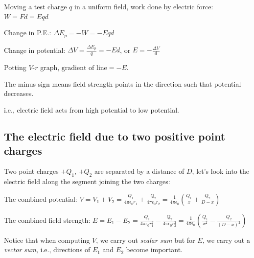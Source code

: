 \documentclass[a4paper,12pt]{book}
\begin{document}
Moving a test charge $q$ in a uniform field, work done by electric force: $W=Fd = Eqd$
		
Change in P.E.: $\Delta E_p = -W = -Eqd$

Change in potential: $\Delta V = \frac{\Delta E_p}{q} = - Ed$, or $E=-\frac{\Delta V}{d}$

Potting $V$-$r$ graph, $\text{gradient of line}=-E$.

The minus sign means field strength points in the direction such that potential decreases.

i.e., electric field acts from high potential to low potential.

\subsection*{The electric field due to two positive point charges}

Two point charges $+Q_1$, $+Q_2$ are separated by a distance of $D$, let's look into the electric field along the segment joining the two charges:

\begin{center}
\end{center}

The combined potential: $V = V_1 + V_2 = \frac{Q_1}{4\pi\epsilon_0r_1} + \frac{Q_2}{4\pi\epsilon_0r_2} = \frac{1}{4\pi\epsilon_0}\left(\frac{Q_1}{x} + \frac{Q_2}{D-x}\right)$

The combined field strength: $E = E_1 - E_2 = \frac{Q_1}{4\pi\epsilon_0r_1^2} - \frac{Q_2}{4\pi\epsilon_0r_2^2} = \frac{1}{4\pi\epsilon_0}\left(\frac{Q_1}{x^2} - \frac{Q_2}{(D-x)^2}\right)$

Notice that when computing $V$, we carry out \emph{scalar sum} but for $E$, we carry out a \emph{vector sum}, i.e., directions of $E_1$ and $E_2$ become important.
\end{document}
